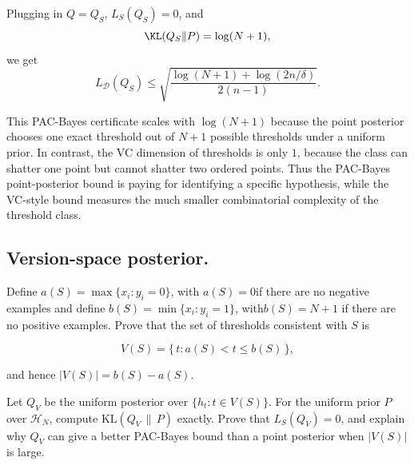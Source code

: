 \documentclass[11pt]{article}
\begin{document}
\begin{solutionbox}
Plugging in $Q=Q_S$, $L_S(Q_S)=0$, and
\[
\KL(Q_S\|P)=\log(N+1),
\]
we get
\[
\boxed{
L_{\mathcal D}(Q_S)
\le
\sqrt{
\frac{
\log(N+1)+\log(2n/\delta)
}{
2(n-1)
}
}.
}
\]

This PAC-Bayes certificate scales with $\log(N+1)$ because the point posterior chooses one exact threshold out of $N+1$ possible thresholds under a uniform prior. In contrast, the VC dimension of thresholds is only $1$, because the class can shatter one point but cannot shatter two ordered points. Thus the PAC-Bayes point-posterior bound is paying for identifying a specific hypothesis, while the VC-style bound measures the much smaller combinatorial complexity of the threshold class.

\end{solutionbox}


\subsection{Version-space posterior.}
Define $a(S) = \max\{x_i : y_i = 0\}$, with $a(S) = 0$if there are no negative examples and define $b(S) = \min\{x_i : y_i = 1\}$, with$b(S) = N+1$ if there are no positive examples. Prove that the set of thresholds consistent with $S$ is


\[
V(S) = \{\, t : a(S) < t \le b(S) \,\},
\]


and hence $|V(S)| = b(S) - a(S)$.

Let $Q_V$ be the uniform posterior over $\{ h_t : t \in V(S) \}$. For the uniform prior 
$P$ over $\mathcal{H}_N$, compute $\mathrm{KL}(Q_V \,\|\, P)$ exactly. Prove that 
$L_S(Q_V) = 0$, and explain why $Q_V$ can give a better PAC-Bayes bound than a point 
posterior when $|V(S)|$ is large.
\end{document}
